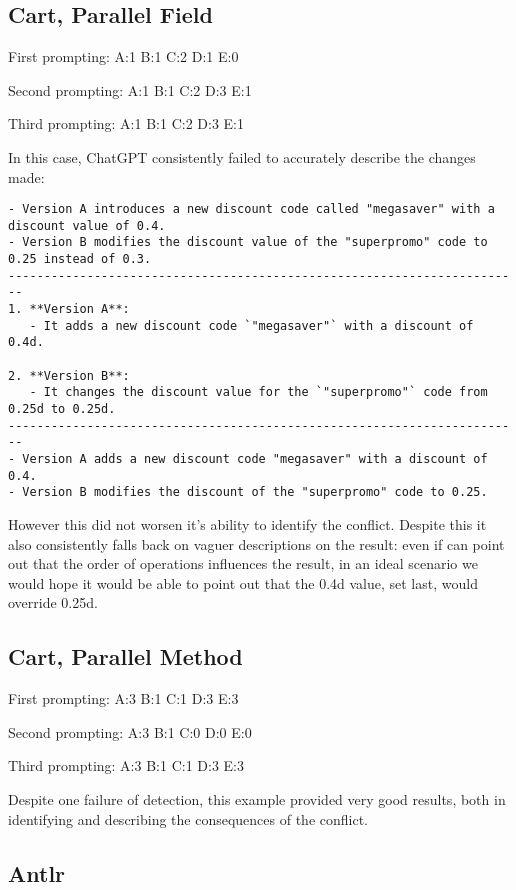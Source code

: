 \subsection{Cart, Parallel Field}

First prompting:
A:1
B:1
C:2
D:1
E:0

Second prompting:
A:1
B:1
C:2
D:3
E:1

Third prompting:
A:1
B:1
C:2
D:3
E:1

In this case, ChatGPT consistently failed to accurately describe the changes made:
\begin{lstlisting}
- Version A introduces a new discount code called "megasaver" with a discount value of 0.4.
- Version B modifies the discount value of the "superpromo" code to 0.25 instead of 0.3.
------------------------------------------------------------------------
1. **Version A**:
   - It adds a new discount code `"megasaver"` with a discount of 0.4d.

2. **Version B**:
   - It changes the discount value for the `"superpromo"` code from 0.25d to 0.25d.
------------------------------------------------------------------------
- Version A adds a new discount code "megasaver" with a discount of 0.4.
- Version B modifies the discount of the "superpromo" code to 0.25.
\end{lstlisting}
However this did not worsen it's ability to identify the conflict. Despite this it also consistently falls back on vaguer descriptions on the result: even if can point out that the order of operations influences the result, in an ideal scenario we would hope it would be able to point out that the 0.4d value, set last, would override 0.25d.


\subsection{Cart, Parallel Method}

First prompting:
A:3
B:1
C:1
D:3
E:3

Second prompting:
A:3
B:1
C:0
D:0
E:0

Third prompting:
A:3
B:1
C:1
D:3
E:3

Despite one failure of detection, this example provided very good results, both in identifying and describing the consequences of the conflict.

\subsection{Antlr}

